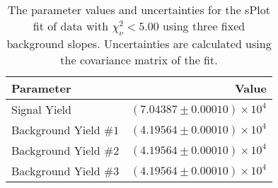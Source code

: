 
\begin{table}[ht]
    \begin{center}
        \begin{tabular}{lr}\toprule
            Parameter & Value \\\midrule
            Signal Yield & $(7.04387 \pm 0.00010) \times 10^{4}$ \\
            Background Yield $\#1$ & $(4.19564 \pm 0.00010) \times 10^{4}$ \\
            Background Yield $\#2$ & $(4.19564 \pm 0.00010) \times 10^{4}$ \\
            Background Yield $\#3$ & $(4.19564 \pm 0.00010) \times 10^{4}$ \\\bottomrule
        \end{tabular}
        \caption{The parameter values and uncertainties for the sPlot fit of data with $\chi^2_\nu < 5.00$ using three fixed background slopes. Uncertainties are calculated using the covariance matrix of the fit.}\label{tab:splot-fit-results-chisqdof-5.00-fixed-3}
    \end{center}
\end{table}
